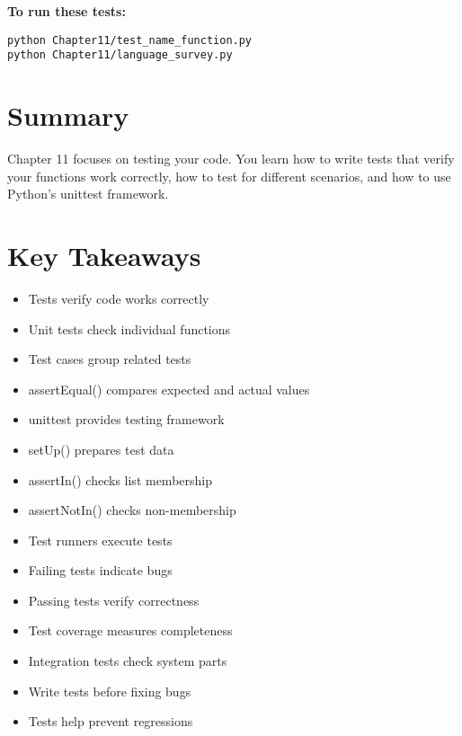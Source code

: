 \textbf{To run these tests:}
\begin{verbatim}
python Chapter11/test_name_function.py
python Chapter11/language_survey.py
\end{verbatim}

\section*{Summary}
Chapter 11 focuses on testing your code. You learn how to write tests that verify your functions work correctly, how to test for different scenarios, and how to use Python's unittest framework.

\section*{Key Takeaways}
\begin{itemize}
    \item Tests verify code works correctly
    \item Unit tests check individual functions
    \item Test cases group related tests
    \item assertEqual() compares expected and actual values
    \item unittest provides testing framework
    \item setUp() prepares test data
    \item assertIn() checks list membership
    \item assertNotIn() checks non-membership
    \item Test runners execute tests
    \item Failing tests indicate bugs
    \item Passing tests verify correctness
    \item Test coverage measures completeness
    \item Integration tests check system parts
    \item Write tests before fixing bugs
    \item Tests help prevent regressions
\end{itemize} 